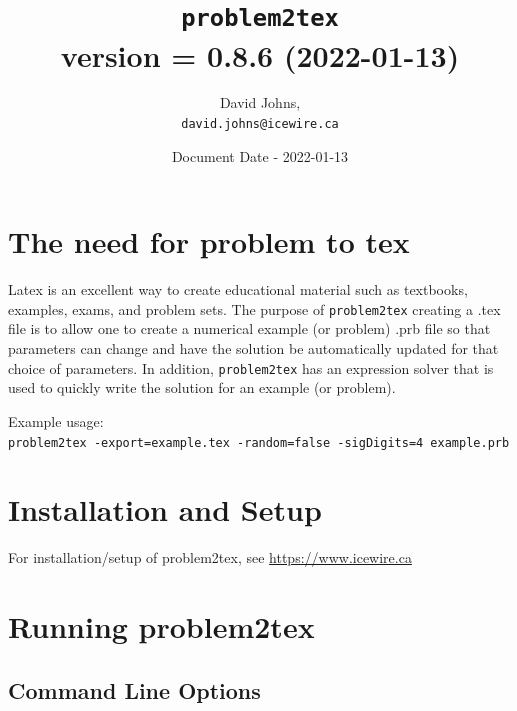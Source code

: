 \documentclass{article}
\title{\color{blue}\texttt{problem2tex} \\ \normalsize{version = 0.8.6 (2022-01-13)}}
\author{
David Johns, \\ \texttt{david.johns@icewire.ca}
}
\date{Document Date - 2022-01-13}
\begin{document}
\maketitle
\tableofcontents

\section{The need for problem to tex}


Latex is an excellent way to create educational material such as textbooks, examples, exams, and problem sets.  The purpose of \texttt{problem2tex} creating a .tex file is to allow one to create a numerical example (or problem) .prb file so that parameters can change and have the solution be automatically updated for that choice of parameters.  In addition, \texttt{problem2tex} has an expression solver that is used to quickly write the solution for an example (or problem).  

Example usage:\\
\texttt{problem2tex -export=example.tex -random=false -sigDigits=4 example.prb}

\section{Installation and Setup}

For installation/setup of problem2tex, see \href{https://www.icewire.ca}{https://www.icewire.ca}




\section{Running problem2tex}

\subsection{Command Line Options}
\end{document}
